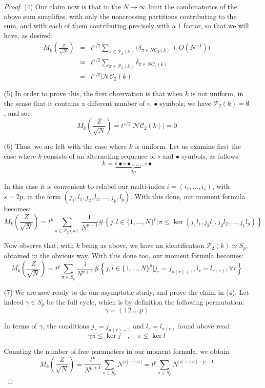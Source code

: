 \documentclass[12pt]{amsbook}
\begin{document}
\begin{proof}
(4) Our claim now is that in the $N\to\infty$ limit the combinatorics of the above sum simplifies, with only the noncrossing partitions contributing to the sum, and with each of them contributing precisely with a 1 factor, so that we will have, as desired:
\begin{eqnarray*}
M_k\left(\frac{Z}{\sqrt{N}}\right)
&=&t^{s/2}\sum_{\pi\in\mathcal P_2(k)}\Big(\delta_{\pi\in NC_2(k)}+O(N^{-1})\Big)\\
&\simeq&t^{s/2}\sum_{\pi\in\mathcal P_2(k)}\delta_{\pi\in NC_2(k)}\\
&=&t^{s/2}|\mathcal{NC}_2(k)|
\end{eqnarray*}

(5) In order to prove this, the first observation is that when $k$ is not uniform, in the sense that it contains a different number of $\circ$, $\bullet$ symbols, we have $\mathcal P_2(k)=\emptyset$, and so:
$$M_k\left(\frac{Z}{\sqrt{N}}\right)=t^{s/2}|\mathcal{NC}_2(k)|=0$$

(6) Thus, we are left with the case where $k$ is uniform. Let us examine first the case where $k$ consists of an alternating sequence of $\circ$ and $\bullet$ symbols, as follows:
$$k=\underbrace{\circ\bullet\circ\bullet\ldots\ldots\circ\bullet}_{2p}$$

In this case it is convenient to relabel our multi-index $i=(i_1,\ldots,i_s)$, with $s=2p$, in the form $(j_1,l_1,j_2,l_2,\ldots,j_p,l_p)$. With this done, our moment formula becomes:
$$M_k\left(\frac{Z}{\sqrt{N}}\right)
=t^p\sum_{\pi\in\mathcal P_2(k)}\frac{1}{N^{p+1}}\#\left\{j,l\in\{1,\ldots,N\}^p\Big|\pi\leq\ker\left(j_1l_1,j_2l_1,j_2l_2,\ldots,j_1l_p\right)\right\}$$

Now observe that, with $k$ being as above, we have an identification $\mathcal P_2(k)\simeq S_p$, obtained in the obvious way. With this done too, our moment formula becomes:
$$M_k\left(\frac{Z}{\sqrt{N}}\right)
=t^p\sum_{\pi\in S_p}\frac{1}{N^{p+1}}\#\left\{j,l\in\{1,\ldots,N\}^p\Big|j_r=j_{\pi(r)+1},l_r=l_{\pi(r)},\forall r\right\}$$

(7) We are now ready to do our asymptotic study, and prove the claim in (4). Let indeed $\gamma\in S_p$ be the full cycle, which is by definition the following permutation:
$$\gamma=(1 \, 2 \, \ldots \, p)$$

In terms of $\gamma$, the conditions $j_r=j_{\pi(r)+1}$ and $l_r=l_{\pi(r)}$ found above read:
$$\gamma\pi\leq\ker j\quad,\quad 
\pi\leq\ker l$$

Counting the number of free parameters in our moment formula, we obtain:
$$M_k\left(\frac{Z}{\sqrt{N}}\right)
=\frac{t^p}{N^{p+1}}\sum_{\pi\in S_p}N^{|\pi|+|\gamma\pi|}
=t^p\sum_{\pi\in S_p}N^{|\pi|+|\gamma\pi|-p-1}$$


\end{proof}
\end{document}
